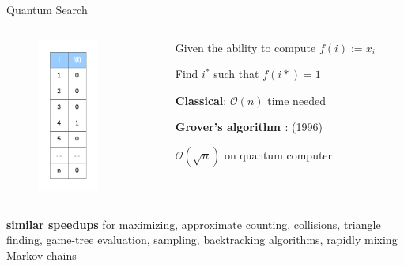 \documentclass[
  ignorenonframetext,
]{beamer}
\begin{document}
\begin{frame}{Quantum Search}
\protect\hypertarget{quantum-search}{}
\begin{columns}[T]
\begin{column}{.5\textwidth}

\begin{figure}
\centering
\includegraphics[width=2cm]{search.png}
\end{figure}
\end{column}

\begin{column}{.5\textwidth}

\begin{block}{}

Given the ability to compute $f(i) := x_i$

Find $i^*$ such that $f(i*) = 1$
\end{block}

\textbf{Classical}: $\mathcal{O}(n)$ time needed

\pause

\textbf{Grover's algorithm \cite{Grover96}}: (1996)

$\mathcal{O}(\sqrt{n})$ on quantum computer

\end{column}
\end{columns}

\pause

\textbf{similar speedups} for maximizing, approximate counting,
collisions, triangle finding, game-tree evaluation, sampling,
backtracking algorithms, rapidly mixing Markov chains
\end{frame}
\end{document}
